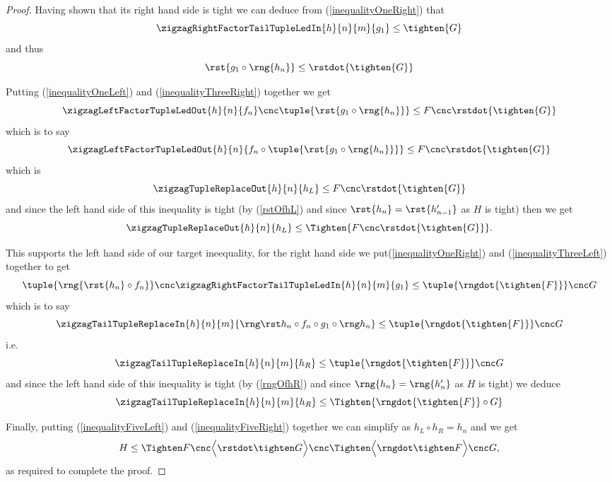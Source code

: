 {\begin{proof}
Having shown that its right hand side is tight
we can deduce from (\ref{inequalityOneRight}) that
\[
\zigzagRightFactorTailTupleLedIn{h}{n}{m}{g_1} \leq \tighten{G}
\]
and thus 
\begin{equation}
\label{inequalityThreeRight}
\rst{ g_1 \circ \rng{h_n}} \leq \rstdot{\tighten{G}}
\end{equation}

Putting (\ref{inequalityOneLeft})
 and (\ref{inequalityThreeRight}) together we get 
\[
\zigzagLeftFactorTupleLedOut{h}{n}{f_n} 
          \cnc \tuple{\rst{ g_1 \circ \rng{h_n}}}
              \leq F \cnc \rstdot{\tighten{G}}
\]
which is to say
\[
\zigzagLeftFactorTupleLedOut{h}{n}
        {f_n \circ \tuple{\rst{ g_1 \circ \rng{h_n}}}}
              \leq F \cnc \rstdot{\tighten{G}}
\]
which is 
\begin{equation}
\label{inequalityFourLeftRewrittenAgain}
\zigzagTupleReplaceOut{h}{n}
        {h_L}
              \leq F \cnc \rstdot{\tighten{G}}
\end{equation}
and since the left hand side of this inequality is tight
(by (\ref{rstOfhL}) and since $\rst{h_n} = \rst{h'_{n-1}}$
 as $H$ is tight)
then we get
\begin{equation}
\label{inequalityFiveLeft}
\zigzagTupleReplaceOut{h}{n}
        {h_L}
              \leq \Tighten{F \cnc \rstdot{\tighten{G}}}.
\end{equation}

This supports the left hand side of our target ineequality, for the right hand side we
put(\ref{inequalityOneRight}) 
and (\ref{inequalityThreeLeft}) together to get
\[
\tuple{\rng{\rst{h_n} \circ f_n}} \cnc \zigzagRightFactorTailTupleLedIn{h}{n}{m}{g_1} 
       \leq \tuple{\rngdot{\tighten{F}}} \cnc G
\]
which is to say
\[
\zigzagTailTupleReplaceIn{h}{n}{m}{\hR} 
       \leq \tuple{\rngdot{\tighten{F}}} \cnc G 
\]
i.e.
\[
\zigzagTailTupleReplaceIn{h}{n}{m}{h_R} 
        \leq  \tuple{\rngdot{\tighten{F}}} \cnc G 
\]
and since the left hand side of this inequality is tight
(by (\ref{rngOfhR}) and since $\rng{h_n} = \rng{h'_n}$
 as $H$ is tight)  we deduce
\begin{equation}
\label{inequalityFiveRight}
\zigzagTailTupleReplaceIn{h}{n}{m}
                {h_R} 
                 \leq  \Tighten{ \rngdot{\tighten{F}} \circ G}
\end{equation}

Finally, putting (\ref{inequalityFiveLeft}) 
and (\ref{inequalityFiveRight}) together
we can  simplify as  $h_L \circ h_R = h_n$ and we get 
\[
H \leq \theTightening,
\]
as required to complete the proof.
\end{proof}
} %





